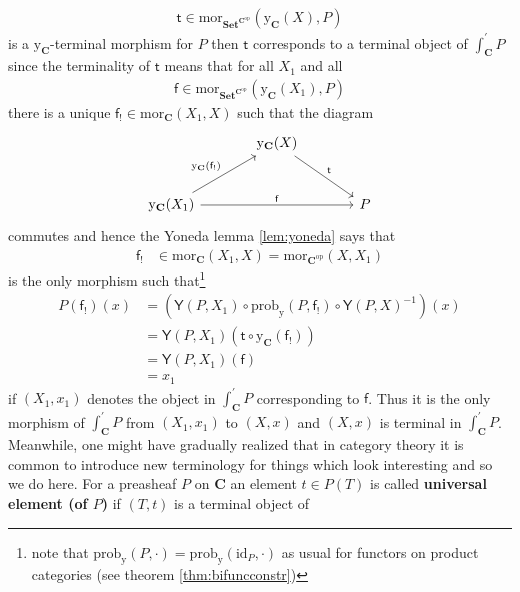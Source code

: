 \begin{align*}
  \mathsf{t}
  \in
  \mathrm{mor}_{\mathbf{Set}^{\mathbf{C}^{\mathrm{op}}}}
  (\mathrm{y}_{\mathbf{C}}(X),P)
\end{align*}
is a $\mathrm{y}_{\mathbf{C}}$-terminal morphism for $P$ then $\mathsf{t}$ corresponds to a terminal object of $\int_{\mathbf{C}}^{\prime}P$ since the terminality of $\mathsf{t}$ means that for all $X_{1}$ and all
\begin{align*}
  \mathsf{f}
  \in
  \mathrm{mor}_{\mathbf{Set}^{\mathbf{C}^{\mathrm{op}}}}
  (\mathrm{y}_{\mathbf{C}}(X_{1}),P)
\end{align*}
there is a unique $\mathsf{f}_{!} \in \mathrm{mor}_{\mathbf{C}}(X_{1},X)$ such that the diagram
\[
\begin{tikzcd}[sep=large]
  &
  \mathrm{y}_{\mathbf{C}}(X)
  \arrow{rd}{\mathsf{t}}
  &
  \\
  \mathrm{y}_{\mathbf{C}}(X_{1})
  \arrow{ru}{\mathrm{y}_{\mathbf{C}}(\mathsf{f}_{!})}
  \arrow{rr}{\mathsf{f}}
  &
  &
  P
\end{tikzcd}
\]
commutes and hence the Yoneda lemma \ref{lem:yoneda} says that
\begin{align*}
  \mathsf{f}_{!}
  &\in
  \mathrm{mor}_{\mathbf{C}}(X_{1},X)
  =
  \mathrm{mor}_{\mathbf{C}^{\mathrm{op}}}(X,X_{1})
\end{align*}
is the only morphism such that\footnote{note that $\mathrm{prob}_{\mathrm{y}}(P,\cdot) = \mathrm{prob}_{\mathrm{y}}(\mathrm{id}_{P},\cdot)$ as usual for functors on product categories (see theorem \ref{thm:bifuncconstr})}
\begin{align*}
  P(\mathsf{f}_{!})(x)
  &=
  \left(
    \mathsf{Y}(P,X_{1})
    \circ
    \mathrm{prob}_{\mathrm{y}}(P,\mathsf{f}_{!})
    \circ
    \mathsf{Y}(P,X)^{-1}
  \right)
  (x)
  \\
  &=
  \mathsf{Y}(P,X_{1})
  \left(
    \mathsf{t}
    \circ
    \mathrm{y}_{\mathbf{C}}(\mathsf{f}_{!})
  \right)
  \\
  &=
  \mathsf{Y}(P,X_{1})
  \left(
    \mathsf{f}
  \right)
  \\
  &=
  x_{1}
\end{align*}
if $(X_{1},x_{1})$ denotes the object in $\int_{\mathbf{C}}^{\prime}P$ corresponding to $\mathsf{f}$. Thus it is the only morphism of $\int_{\mathbf{C}}^{\prime}P$ from $(X_{1},x_{1})$ to $(X,x)$ and $(X,x)$ is terminal in $\int_{\mathbf{C}}^{\prime}P$. Meanwhile, one might have gradually realized that in category theory it is common to introduce new terminology for things which look interesting and so we do here. For a preasheaf $P$ on $\mathbf{C}$ an element $t \in P(T)$ is called \textbf{universal element (of $P$)} if $(T,t)$ is a terminal object of
